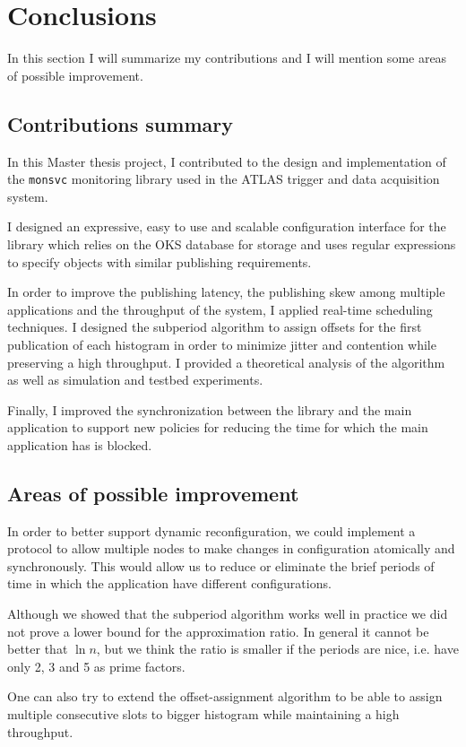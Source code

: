\chapter{Conclusions} %
\label{Capitolul6}


In this section I will summarize my contributions and I will mention some areas of possible improvement.

\section{Contributions summary}

In this Master thesis project, I contributed to the design and implementation of the {\tt monsvc} monitoring library used in the ATLAS trigger and data acquisition system.

I designed an expressive, easy to use and scalable configuration interface for the library which relies on the OKS \citep{jones1998oks} database for storage and uses regular expressions to specify objects with similar publishing requirements.

In order to improve the publishing latency, the publishing skew among multiple applications and the throughput of the system, I applied real-time scheduling techniques. I designed the subperiod algorithm to assign offsets for the first publication of each histogram in order to minimize jitter and contention while preserving a high throughput. I provided a theoretical analysis of the algorithm as well as simulation and testbed experiments.

Finally, I improved the synchronization between the library and the main application to support new policies for reducing the time for which the main application has is blocked.


\section{Areas of possible improvement}

In order to better support dynamic reconfiguration, we could implement a protocol to allow multiple nodes to make changes in configuration atomically and synchronously. This would allow us to reduce or eliminate the brief periods of time in which the application have different configurations.

Although we showed that the subperiod algorithm works well in practice we did not prove a lower bound for the approximation ratio. In general it cannot be better that $\ln n$, but we think the ratio is smaller if the periods are nice, i.e. have only 2, 3 and 5 as prime factors.

One can also try to extend the offset-assignment algorithm to be able to assign multiple consecutive slots to bigger histogram while maintaining a high throughput. 
